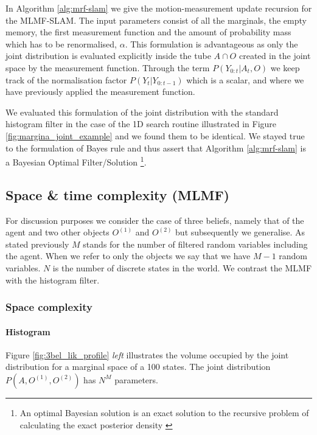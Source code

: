 In Algorithm \ref{alg:mrf-slam} we give the motion-measurement update recursion for the MLMF-SLAM. The input parameters consist 
of all the marginals, the empty memory, the first measurement function and the amount of probability mass which has to be renormalised, $\alpha$. 
This formulation is advantageous as only the joint distribution is evaluated explicitly inside the tube 
$A\cap O$ created in the joint space by the measurement function. Through the term $P(Y_{0:t}|A_t,O)$ we keep track of the normalisation factor $P(Y_t|Y_{0:t-1})$ which 
is a scalar, and where we have previously applied the measurement function. 

We evaluated this formulation of the joint distribution with the standard histogram filter in the case of the 1D search routine 
illustrated in Figure \ref{fig:margina_joint_example} and we found them to be identical. We stayed true to the formulation of Bayes rule 
and thus assert that Algorithm \ref{alg:mrf-slam} is a Bayesian Optimal Filter/Solution
\footnote{An optimal Bayesian solution is an exact solution to the recursive problem of calculating the exact posterior density 
\cite{PF_tutorial_2002}}.

\subsection{Space \& time complexity (MLMF)}\label{ch5:space_time_complexity_MLMF}

For discussion purposes we consider the case of three beliefs, namely that of the agent and two other objects $O^{(1)}$ and $O^{(2)}$ but 
subsequently we generalise. As stated previously $M$ stands for the number of filtered random variables including the agent. When we refer 
to only the objects we say that we have $M-1$ random variables. $N$ is the number of discrete states in the world. We contrast
the MLMF with the histogram filter.

\subsubsection{Space complexity}

\paragraph{Histogram}

Figure \ref{fig:3bel_lik_profile} \textit{left} illustrates the volume occupied by the joint distribution for a marginal space of a 
100 states. The joint distribution $P(A,O^{(1)},O^{(2)})$ has $N^{M}$ parameters. 

